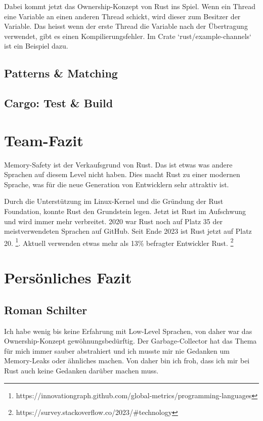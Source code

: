 \documentclass[letterpaper,12pt]{article}
\begin{document}
    Dabei kommt jetzt das Ownership-Konzept von Rust ins Spiel.
    Wenn ein Thread eine Variable an einen anderen Thread schickt, wird dieser zum Besitzer der Variable.
    Das heisst wenn der erste Thread die Variable nach der Übertragung verwendet, gibt es einen Kompilierungsfehler.
    Im Crate `rust/example-channels` ist ein Beispiel dazu.

    \subsection{Patterns \& Matching}\label{subsec:patterns-&-matching}

    \subsection{Cargo: Test \& Build}\label{subsec:cargo:-test-&-build}


    \section{Team-Fazit}\label{sec:team-fazit}
    Memory-Safety ist der Verkaufsgrund von Rust.
    Das ist etwas was andere Sprachen auf diesem Level nicht haben.
    Dies macht Rust zu einer modernen Sprache, was für die neue Generation von Entwicklern sehr attraktiv ist.

    Durch die Unterstützung im Linux-Kernel und die Gründung der Rust Foundation, konnte Rust den Grundstein legen.
    Jetzt ist Rust im Aufschwung und wird immer mehr verbreitet.
    2020 war Rust noch auf Platz 35 der meistverwendeten Sprachen auf GitHub.
    Seit Ende 2023 ist Rust jetzt auf Platz 20. \footnote{https://innovationgraph.github.com/global-metrics/programming-languages}.
    Aktuell verwenden etwas mehr als 13\% befragter Entwickler Rust. \footnote{https://survey.stackoverflow.co/2023/#technology}


    \section{Persönliches Fazit}\label{sec:personliches-fazit}

    \subsection{Roman Schilter}\label{subsec:roman}
    Ich habe wenig bis keine Erfahrung mit Low-Level Sprachen, von daher war das Ownership-Konzept gewöhnungsbedürftig.
    Der Garbage-Collector hat das Thema für mich immer sauber abstrahiert und ich musste mir nie Gedanken um Memory-Leaks oder ähnliches machen.
    Von daher bin ich froh, dass ich mir bei Rust auch keine Gedanken darüber machen muss.
\end{document}
